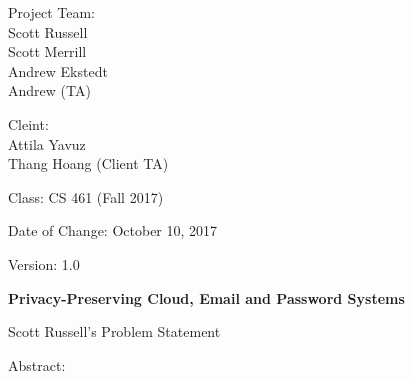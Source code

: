 \documentclass[10pt]{letter} %
\begin{document}

\begin{letter}{Project Team: \\
Scott Russell\\
Scott Merrill \\
Andrew Ekstedt \\
Andrew (TA)


Cleint:\\
Attila Yavuz \\
Thang Hoang (Client TA)


Class: CS 461 (Fall 2017)


Date of Change: October 10, 2017


Version: 1.0
} 


\begin{center}
\large\bf Privacy-Preserving Cloud, Email and Password Systems %


Scott Russell's Problem Statement\\ %
\end{center} 



\opening{Abstract:} 
 

\end{letter}
\end{document}
